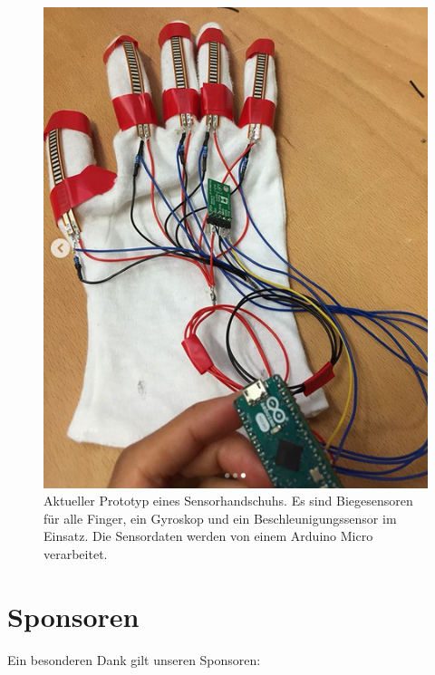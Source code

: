 \documentclass{sciposter}
\begin{document}
\begin{multicols}{3}
\begin{figure}[h]
	\centering
	\includegraphics[scale=1.3]{../figures/Sensorhandschuh}
	\caption{Aktueller Prototyp eines Sensorhandschuhs. Es sind Biegesensoren für alle Finger, ein Gyroskop und ein Beschleunigungssensor im Einsatz. Die Sensordaten werden von einem Arduino Micro verarbeitet.}
	\label{fig:Sensorhandschuh}
\end{figure}


\section{Sponsoren}
\noindent
Ein besonderen Dank gilt unseren Sponsoren: \\

\vfill


\end{multicols}
\end{document}

